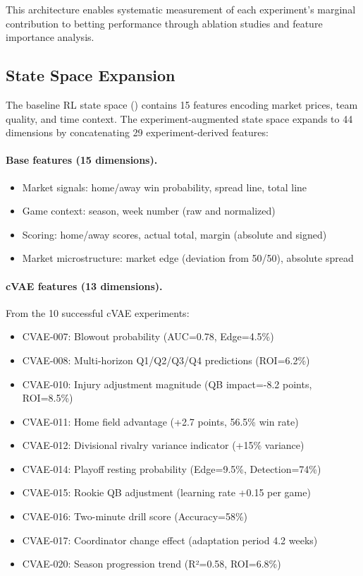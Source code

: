 This architecture enables systematic measurement of each experiment's marginal contribution to betting performance through ablation studies and feature importance analysis.

\subsection{State Space Expansion}

The baseline RL state space () contains 15 features encoding market prices, team quality, and time context. The experiment-augmented state space expands to 44 dimensions by concatenating 29 experiment-derived features:

\paragraph{Base features (15 dimensions).}
\begin{itemize}
  \item Market signals: home/away win probability, spread line, total line
  \item Game context: season, week number (raw and normalized)
  \item Scoring: home/away scores, actual total, margin (absolute and signed)
  \item Market microstructure: market edge (deviation from 50/50), absolute spread
\end{itemize}

\paragraph{cVAE features (13 dimensions).}
From the 10 successful cVAE experiments:
\begin{itemize}
  \item CVAE-007: Blowout probability (AUC=0.78, Edge=4.5\%)
  \item CVAE-008: Multi-horizon Q1/Q2/Q3/Q4 predictions (ROI=6.2\%)
  \item CVAE-010: Injury adjustment magnitude (QB impact=-8.2 points, ROI=8.5\%)
  \item CVAE-011: Home field advantage (+2.7 points, 56.5\% win rate)
  \item CVAE-012: Divisional rivalry variance indicator (+15\% variance)
  \item CVAE-014: Playoff resting probability (Edge=9.5\%, Detection=74\%)
  \item CVAE-015: Rookie QB adjustment (learning rate +0.15 per game)
  \item CVAE-016: Two-minute drill score (Accuracy=58\%)
  \item CVAE-017: Coordinator change effect (adaptation period 4.2 weeks)
  \item CVAE-020: Season progression trend (R²=0.58, ROI=6.8\%)
\end{itemize}

